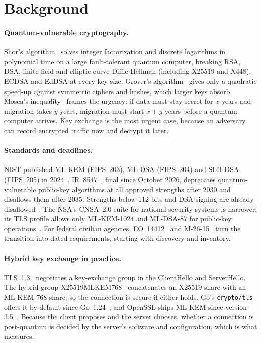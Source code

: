 \section{Background}
\label{sec:background}

\paragraph{Quantum-vulnerable cryptography.}
Shor's algorithm~\cite{shor1997} solves integer factorization and discrete
logarithms in polynomial time on a large fault-tolerant quantum computer,
breaking RSA, DSA, finite-field and elliptic-curve Diffie-Hellman (including
X25519 and X448), ECDSA and EdDSA at every key size. Grover's
algorithm~\cite{grover1996} gives only a quadratic speed-up against symmetric
ciphers and hashes, which larger keys absorb. Mosca's
inequality~\cite{mosca2018} frames the urgency: if data must stay secret for
$x$ years and migration takes $y$ years, migration must start $x + y$ years
before a quantum computer arrives. Key exchange is the most urgent case,
because an adversary can record encrypted traffic now and decrypt it later.

\paragraph{Standards and deadlines.}
NIST published ML-KEM (FIPS~203), ML-DSA (FIPS~204) and SLH-DSA (FIPS~205)
in 2024~\cite{fips203,fips204,fips205}. IR~8547~\cite{ir8547}, final since
October 2026, deprecates quantum-vulnerable public-key algorithms at all
approved strengths after 2030 and disallows them after 2035. Strengths below
112 bits and DSA signing are already disallowed~\cite{sp800131a,fips1865}.
The NSA's CNSA~2.0 suite for national security systems is narrower: its TLS
profile allows only ML-KEM-1024 and ML-DSA-87 for public-key
operations~\cite{cnsa2tls}. For federal civilian agencies, EO~14412~\cite{eo14412}
and M-26-15~\cite{omb2615} turn the transition into dated requirements,
starting with discovery and inventory.

\paragraph{Hybrid key exchange in practice.}
TLS~1.3~\cite{rfc8446} negotiates a key-exchange group in the ClientHello and
ServerHello. The hybrid group X25519MLKEM768~\cite{ecdhemlkem} concatenates an
X25519 share with an ML-KEM-768 share, so the connection is secure if either
holds. Go's \texttt{crypto/tls} offers it by default since
Go~1.24~\cite{go124}, and OpenSSL ships ML-KEM since version
3.5~\cite{openssl35}. Because the client
proposes and the server chooses, whether a connection is post-quantum is
decided by the server's software and configuration, which is what 
measures.
